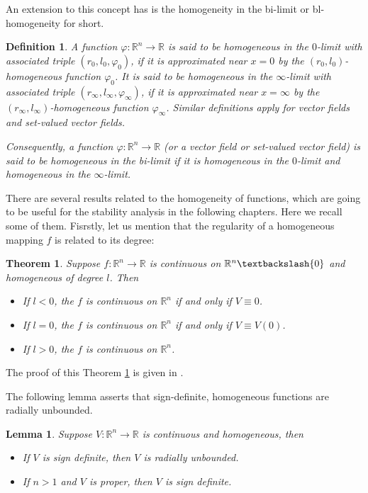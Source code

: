 \documentclass[11pt,letterpaper,twoside,openright]{report}
\newcommand{\RE}{\mathbb{R}}
\newtheorem{theorem}{Theorem}[chapter]
\newtheorem{definition}{Definition}[chapter]
\newtheorem{lemma}{Lemma}[chapter]
\begin{document}
An extension to this concept has is the homogeneity in the bi-limit or bl-homogeneity for short.

\begin{definition}
	A function $\varphi: \RE^n \rightarrow \RE$ is said to be homogeneous in the $0$-limit with associated triple $(r_0,l_0,\varphi_0)$, if it is approximated near $x=0$ by the $(r_0,l_0)$-homogeneous function $\varphi_0$. It is said to be homogeneous in the $\infty$-limit with associated triple $(r_{\infty},l_{\infty},\varphi_{\infty})$, if it is approximated near $x=\infty$ by the $(r_{\infty},l_{\infty})$-homogeneous function $\varphi_{\infty}$. Similar definitions apply for vector fields and set-valued vector fields.
	
	Consequently, a function $\varphi: \RE^n \rightarrow \RE$ (or a vector field or set-valued vector field) is said to be homogeneous in the bi-limit if it is homogeneous in the $0$-limit and homogeneous in the $\infty$-limit.
\end{definition}

There are several results related to the homogeneity of functions, which are going to be useful for the stability analysis in the following chapters. Here we recall some of them. Fisrstly, let us mention that the regularity of a homogeneous mapping $f$ is related to its degree:

\begin{theorem}\label{theo: Regularity}
	Suppose $f: \RE^n \rightarrow \RE$ is continuous on $\RE^n \textbackslash \{0 \}$ and homogeneous of degree $l$. Then
	\begin{itemize}
		\item If $l<0$, the $f$ is continuous on $\RE^n$ if and only if $V\equiv 0$.
		\item If $l=0$, the $f$ is continuous on $\RE^n$ if and only if $V\equiv V(0)$.
		\item If $l>0$, the $f$ is continuous on $\RE^n$.
	\end{itemize}
\end{theorem}
The proof of this Theorem \ref{theo: Regularity} is given in \cite{Bhat2005}. 

The following lemma asserts that sign-definite, homogeneous functions are radially unbounded.

\begin{lemma}
	Suppose $V: \RE^n \rightarrow \RE$ is continuous and homogeneous, then
	\begin{itemize}
		\item If $V$ is sign definite, then $V$ is radially unbounded.
		\item If $n>1$ and $V$ is proper, then $V$ is sign definite.
	\end{itemize}
\end{lemma}
\end{document}
